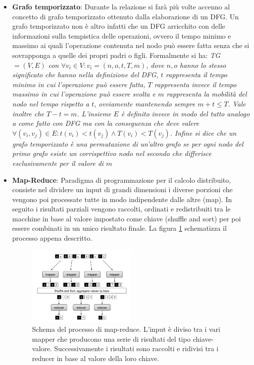 \documentclass[]{IEEEtran}
\begin{document}
\begin{itemize}
	\item \textbf{Grafo temporizzato}: Durante la relazione si farà più volte accenno al concetto di grafo temporizzato ottenuto dalla elaborazione di un DFG. Un grafo temporizzato non è altro infatti che un DFG arricchito con delle informazioni sulla tempistica delle operazioni, ovvero il tempo minimo e massimo ai quali l'operazione contenuta nel nodo può essere fatta senza che si sovrapponga a quelle dei propri padri o figli. Formalmente si ha:
	\it{TG} \normalfont $=(V,E)$ con $\forall v_i\in V : v_i = (n,o,t,T,m)$, dove $n,o$ hanno lo stesso significato che hanno nella definizione del DFG, $t$ rappresenta il tempo \emph{minimo} in cui l'operazione può essere fatta, $T$ rappresenta invece il tempo \emph{massimo} in cui l'operazione può essere svolta e $m$ rappresenta la mobilità del nodo nel tempo rispetto a $t$, ovviamente mantenendo sempre $m+t\le T$. Vale inoltre che $T - t = m$. L'insieme $E$ è definito invece in modo del tutto analogo a come fatto con DFG ma con la conseguenza che deve valere $\forall (v_i,v_j) \in E : t(v_i)<t(v_j) \land T(v_i)<T(v_j)$.
	Infine si dice che un grafo temporizzato è una \emph{permutazione} di un'altro grafo se per ogni nodo del primo grafo esiste un corrispettivo nodo nel secondo che differisce esclusivamente per il valore di $m$
	
	\item \textbf{Map-Reduce}\cite{MAPRED}: Paradigma di programmazione per il calcolo distribuito, consiste nel dividere un input di grandi dimensioni i diverse porzioni che vengono poi processate tutte in modo indipendente dalle altre (map). In seguito i risultati parziali vengono raccolti, ordinati e redistribuiti tra le macchine in base al valore impostato come chiave (shuffle and sort) per poi essere combinati in un unico risultato finale. La figura \ref{mapred} schematizza il processo appena descritto.
	\begin{figure}[htp]
		\centering
		\includegraphics[width=0.5\textwidth]{images/mapred.png}
		\caption{Schema del processo di map-reduce. L'input è diviso tra i vari mapper che producono una serie di risultati del tipo chiave-valore. Successivamente i risultati sono raccolti e ridivisi tra i reducer in base al valore della loro chiave.}
		\label{mapred}
	\end{figure}
	

\end{itemize}
\end{document}
